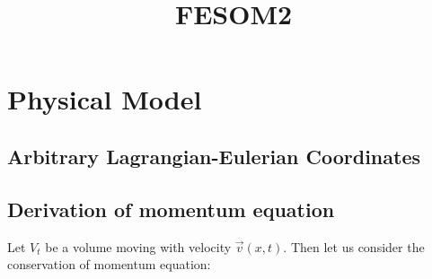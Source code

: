 \documentclass[10pt]{article}
\begin{document}
\title{FESOM2}
\date{}
\maketitle

\section{Physical Model}
\subsection{Arbitrary Lagrangian-Eulerian Coordinates}
\subsection{Derivation of momentum equation}

Let $V_{t}$ be a volume moving with velocity $\vec{v}(x,t)$. Then let us consider the conservation of momentum equation:

\end{document}
